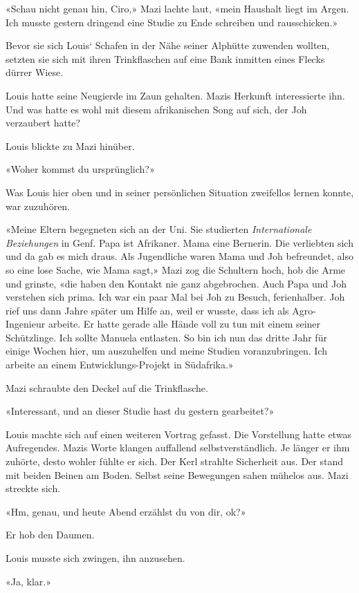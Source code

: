 «Schau nicht genau hin, Ciro,» Mazi lachte laut, «mein Haushalt liegt im
Argen. Ich musste gestern dringend eine Studie zu Ende schreiben und
rausschicken.»

Bevor sie sich Louis` Schafen in der Nähe seiner Alphütte zuwenden
wollten, setzten sie sich mit ihren Trinkflaschen auf eine Bank inmitten
eines Flecks dürrer Wiese.

Louis hatte seine Neugierde im Zaun gehalten. Mazis Herkunft
interessierte ihn. Und was hatte es wohl mit diesem afrikanischen Song
auf sich, der Joh verzaubert hatte?

Louis blickte zu Mazi hinüber.

«Woher kommst du ursprünglich?»

Was Louis hier oben und in seiner persönlichen Situation zweifellos
lernen konnte, war zuzuhören.

«Meine Eltern begegneten sich an der Uni. Sie studierten
\emph{Internationale Beziehungen} in Genf. Papa ist Afrikaner. Mama eine
Bernerin. Die verliebten sich und da gab es mich draus. Als Jugendliche
waren Mama und Joh befreundet, also so eine lose Sache, wie Mama sagt,»
Mazi zog die Schultern hoch, hob die Arme und grinste, «die haben den
Kontakt nie ganz abgebrochen. Auch Papa und Joh verstehen sich prima.
Ich war ein paar Mal bei Joh zu Besuch, ferienhalber. Joh rief uns dann
Jahre später um Hilfe an, weil er wusste, dass ich als Agro-Ingenieur
arbeite. Er hatte gerade alle Hände voll zu tun mit einem seiner
Schützlinge. Ich sollte Manuela entlasten. So bin ich nun das dritte
Jahr für einige Wochen hier, um auszuhelfen und meine Studien
voranzubringen. Ich arbeite an einem Entwicklungs-Projekt in Südafrika.»

Mazi schraubte den Deckel auf die Trinkflasche.

«Interessant, und an dieser Studie hast du gestern gearbeitet?»

Louis machte sich auf einen weiteren Vortrag gefasst. Die Vorstellung
hatte etwas Aufregendes. Mazis Worte klangen auffallend
selbstverständlich. Je länger er ihm zuhörte, desto wohler fühlte er
sich. Der Kerl strahlte Sicherheit aus. Der stand mit beiden Beinen am
Boden. Selbst seine Bewegungen sahen mühelos aus. Mazi streckte sich.

«Hm, genau, und heute Abend erzählst du von dir, ok?»

Er hob den Daumen.

Louis musste sich zwingen, ihn anzusehen.

«Ja, klar.»

